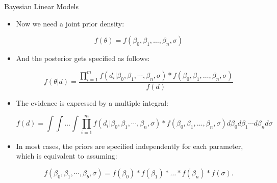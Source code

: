 \documentclass[handout]{beamer}
\begin{document}
\begin{frame}{Bayesian Linear Models}
\scriptsize{
\begin{itemize}


\item Now we need a joint prior density:

\begin{displaymath}
f(\theta)= f(\beta_0,\beta_1,\dots,\beta_n,\sigma)
\end{displaymath}


\item And the posterior gets specified as follows:

\begin{displaymath}
f(\theta|d)= \frac{ \prod_{i=1}^m f(d_i|\beta_0,\beta_1,\cdots,\beta_n,\sigma)*f(\beta_0,\beta_1,\dots,\beta_n,\sigma)}{f(d)}
\end{displaymath}


\item The evidence is expressed by a multiple integral:

\begin{displaymath}
 f(d) = \int \int \dots \int \prod_{i=1}^m f(d_i|\beta_0,\beta_1,\cdots,\beta_n,\sigma)* f(\beta_0,\beta_1,\dots,\beta_n,\sigma) d\beta_0 d\beta_1 \cdots d\beta_nd\sigma
\end{displaymath}



\item In most cases, the priors are specified independently for each parameter, which is equivalent to assuming:


\begin{displaymath}
f(\beta_0,\beta_1,\cdots,\beta_b,\sigma)=f(\beta_0)*f(\beta_1)*\dots*f(\beta_n)*f(\sigma). 
\end{displaymath}






 
\end{itemize}



} 

\end{frame}
\end{document}
